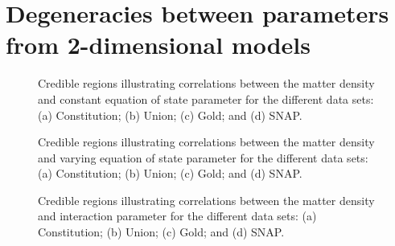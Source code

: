\section{Degeneracies between parameters from 2-dimensional models}
\label{sec:5.2}

\begin{figure}
\centering

\hfill
{}

\medskip

\hfill
{}

\caption{Credible regions illustrating correlations between the matter density and constant equation of state parameter for the different data sets: (a) Constitution; (b) Union; (c) Gold; and (d) SNAP.}
\label{fig:fig5.2}
\end{figure}

\begin{figure}
\centering

\hfill
{}

\medskip

\hfill
{}

\caption{Credible regions illustrating correlations between the matter density and varying equation of state parameter for the different data sets: (a) Constitution; (b) Union; (c) Gold; and (d) SNAP.}
\label{fig:fig5.3}
\end{figure}

\begin{figure}
\centering

\hfill
{}

\medskip

\hfill
{}

\caption{Credible regions illustrating correlations between the matter density and interaction parameter for the different data sets: (a) Constitution; (b) Union; (c) Gold; and (d) SNAP.}
\label{fig:fig5.4}
\end{figure}


